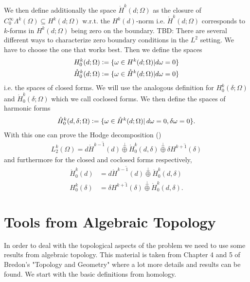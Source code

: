 \documentclass[12pt,a4paper]{article}
\theoremstyle{definition}
\begin{document}
We then define 
additionally the space $\mathring{H}^k(d;\Omega)$ as the closure of 
$C_0^\infty \Lambda^k(\Omega) \subseteq H^k(d;\Omega)$ w.r.t. 
the $H^k(d)$-norm i.e. 
$\mathring{H}^k(d;\Omega)$ corresponds to $k$-forms in $H^k(d;\Omega)$
being zero on the boundary. {\color{red} TBD: There are several different 
ways to characterize zero boundary conditions in the $L^2$ setting. We have
to choose the one that works best.} %
Then we define the spaces 
\begin{align*}
    H^k_0(d;\Omega) &\vcentcolon= \{ \omega \in H^k(d;\Omega) 
    | d\omega = 0 \} \\
    \mathring{H}^k_0(d;\Omega) &\vcentcolon= \{ \omega \in \mathring{H}^k(d;\Omega) 
    | d\omega = 0 \}
\end{align*}
i.e. the spaces of closed forms. We will use the analogous definition for 
$H^k_0(\delta;\Omega)$ and $\mathring{H}^k_0(\delta;\Omega)$ which we call 
coclosed forms. We then define the spaces of harmonic forms
\begin{align*}
    \mathring{H}^k_0(d,\delta;\Omega) \vcentcolon= 
    \{ \omega \in \mathring{H}^k(d;\Omega) 
    | \, d\omega = 0, \delta\omega = 0 \}.
\end{align*}
With this one can prove the Hodge decomposition (\cite[Lemma 1]{arnold})
\begin{align}
    L_2^k(\Omega) = \overline{d\mathring{H}^{k-1}(d)} \stackrel{\perp}{\oplus} 
    \mathring{H}^k_0(d,\delta) \stackrel{\perp}{\oplus} 
    \overline{\delta H^{k+1}(\delta)} \label{hodge_decomposition}
\end{align}
and furthermore for the closed and coclosed forms respectively,
\begin{align}
    \mathring{H}^k_0(d) &= \overline{d\mathring{H}^{k-1}(d)} 
    \stackrel{\perp}{\oplus}
    \mathring{H}^k_0(d,\delta) \label{decomposition_closed_forms} \\
    H^k_0(\delta) &= \overline{\delta H^{k+1}(\delta)} \stackrel{\perp}{\oplus}
    \mathring{H}^k_0(d,\delta). \label{decomposition_coclosed_forms}
\end{align}

\section{Tools from Algebraic Topology}

In order to deal with the topological aspects of the problem we need to 
use some results from algebraic topology. This material is taken from 
Chapter 4 and 5 of Bredon's "Topology and Geometry" 
\cite{topology_and_geometry} where a lot more details and results can be found.
We start with the basic definitions from homology.
\end{document}
